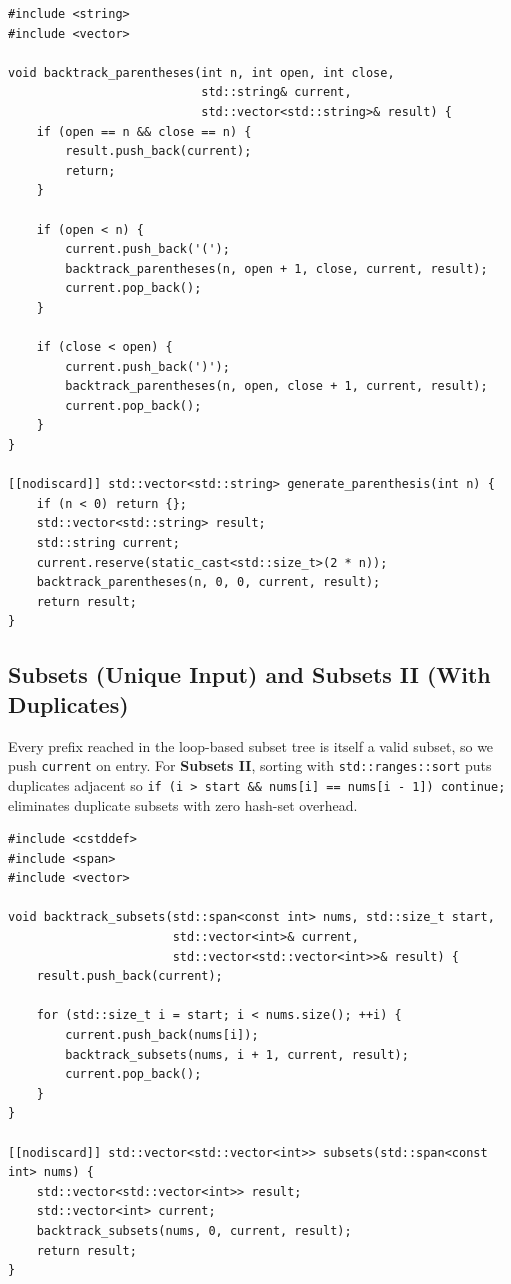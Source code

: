 \documentclass[11pt,a4paper]{article}
\theoremstyle{definition}
\begin{document}
\begin{lstlisting}[caption={Generate Parentheses with Constraint Pruning}]
#include <string>
#include <vector>

void backtrack_parentheses(int n, int open, int close,
                           std::string& current,
                           std::vector<std::string>& result) {
    if (open == n && close == n) {
        result.push_back(current);
        return;
    }

    if (open < n) {
        current.push_back('(');
        backtrack_parentheses(n, open + 1, close, current, result);
        current.pop_back();
    }

    if (close < open) {
        current.push_back(')');
        backtrack_parentheses(n, open, close + 1, current, result);
        current.pop_back();
    }
}

[[nodiscard]] std::vector<std::string> generate_parenthesis(int n) {
    if (n < 0) return {};
    std::vector<std::string> result;
    std::string current;
    current.reserve(static_cast<std::size_t>(2 * n));
    backtrack_parentheses(n, 0, 0, current, result);
    return result;
}
\end{lstlisting}

\subsection{Subsets (Unique Input) and Subsets II (With Duplicates)}

Every prefix reached in the loop-based subset tree is itself a valid subset, so we push \texttt{current} on entry. For \textbf{Subsets II}, sorting with \texttt{std::ranges::sort} puts duplicates adjacent so \texttt{if (i > start \&\& nums[i] == nums[i - 1]) continue;} eliminates duplicate subsets with zero hash-set overhead.

\begin{lstlisting}[caption={Subsets (Power Set) on Distinct Elements}]
#include <cstddef>
#include <span>
#include <vector>

void backtrack_subsets(std::span<const int> nums, std::size_t start,
                       std::vector<int>& current,
                       std::vector<std::vector<int>>& result) {
    result.push_back(current);

    for (std::size_t i = start; i < nums.size(); ++i) {
        current.push_back(nums[i]);
        backtrack_subsets(nums, i + 1, current, result);
        current.pop_back();
    }
}

[[nodiscard]] std::vector<std::vector<int>> subsets(std::span<const int> nums) {
    std::vector<std::vector<int>> result;
    std::vector<int> current;
    backtrack_subsets(nums, 0, current, result);
    return result;
}
\end{lstlisting}
\end{document}
